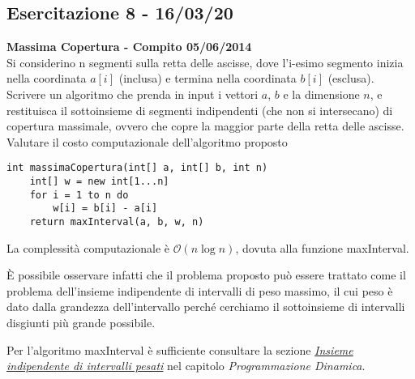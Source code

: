 \documentclass[../cheatSheetAlgoritmi.tex]{subfiles}
\begin{document}
\subsection{Esercitazione 8 - 16/03/20}
\textbf{Massima Copertura - Compito 05/06/2014}\\
Si considerino n segmenti sulla retta delle ascisse, dove l'i-esimo segmento inizia nella coordinata $a[i]$ (inclusa) e termina nella coordinata $b[i]$ (esclusa). Scrivere un algoritmo che prenda in input i vettori $a$, $b$ e la dimensione $n$, e restituisca il sottoinsieme di segmenti indipendenti (che non si intersecano) di copertura massimale, ovvero che copre la maggior parte della retta delle ascisse. Valutare il costo computazionale dell'algoritmo proposto
\begin{lstlisting}[caption=Massima copertura]
int massimaCopertura(int[] a, int[] b, int n)
    int[] w = new int[1...n]
    for i = 1 to n do
        w[i] = b[i] - a[i]
    return maxInterval(a, b, w, n)
\end{lstlisting}

La complessità computazionale è $\mathcal{O}(n \log n)$, dovuta alla funzione maxInterval. 

È possibile osservare infatti che il problema proposto può essere trattato come il problema \hfill \break dell'insieme indipendente di intervalli di peso massimo, il cui peso è dato dalla grandezza \hfill \break dell'intervallo perché cerchiamo il sottoinsieme di intervalli disgiunti più grande possibile.
 
Per l'algoritmo maxInterval è sufficiente consultare la sezione \hyperref[sec:indSet]{\emph{Insieme indipendente di intervalli pesati}} nel capitolo \emph{Programmazione Dinamica}.
\end{document}
